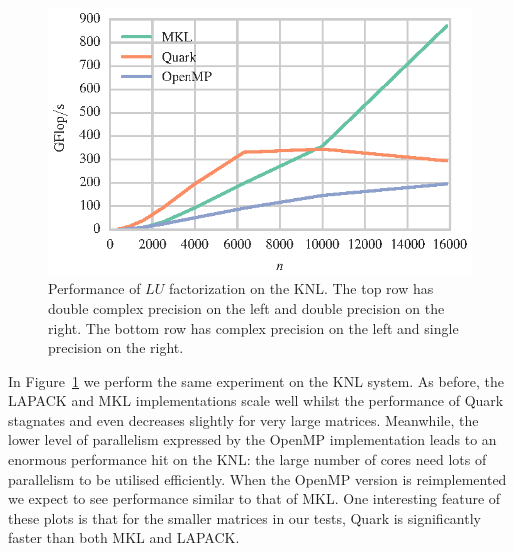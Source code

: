 \documentclass[a4paper,12pt]{article}
\begin{document}
\begin{figure}[t]
  \includegraphics[scale=.85]{fig/knl_ram_sgetrf_weak_scaling.eps}
  \caption{Performance of $LU$ factorization on the KNL.
    The top row has double complex precision on the left and double
    precision on the right.
    The bottom row has complex precision on the left and single
    precision on the right.}
  \label{fig.lu_knl_ram}
\end{figure}

In Figure~\ref{fig.lu_knl_ram} we perform the same experiment
on the KNL system.
As before,
the LAPACK and MKL implementations scale well whilst
the performance of Quark stagnates and even decreases
slightly for very large matrices.
Meanwhile,
the lower level of parallelism expressed by the OpenMP
implementation leads to an enormous performance hit on the KNL:
the large number of cores need lots of parallelism
to be utilised efficiently.
When the OpenMP version is reimplemented we expect to see
performance similar to that of MKL.
One interesting feature of these plots is that for
the smaller matrices in our tests,
Quark is significantly faster than both MKL and LAPACK.

\end{document}
